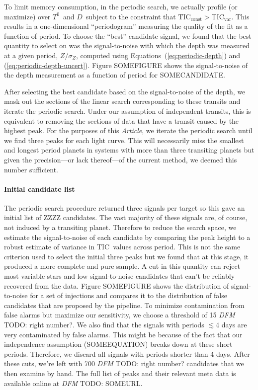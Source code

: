 \documentclass[12pt,preprint]{aastex}
\newcommand{\paper}{\textsl{Article}}
\newcommand{\TIC}{{\ensuremath{\mathrm{TIC}}}}
\newcommand{\todo}[3]{{\color{#2} \emph{#1} TODO: #3}}
\newcommand{\dfmtodo}[1]{\todo{DFM}{red}{#1}}
\newcommand{\phase}{{\ensuremath{T^0}}}
\newcommand{\duration}{{\ensuremath{D}}}
\newcommand{\depth}{{\ensuremath{Z}}}
\begin{document}
To limit memory consumption, in the periodic search, we actually profile (or
maximize) over \phase\ and \duration\ subject to the constraint that
$\TIC_\mathrm{const} > \TIC_\mathrm{var}$.
This results in a one-dimensional ``periodogram'' measuring the quality of
the fit as a function of period.
To choose the ``best'' candidate signal, we found that the best quantity to
select on was the signal-to-noise with which the depth was measured at a
given period, $\depth/\sigma_\depth$, computed using
Equations~(\ref{eq:periodic-depth}) and (\ref{eq:periodic-depth-uncert}).
Figure SOMEFIGURE shows the signal-to-noise of the depth measurement as a
function of period for SOMECANDIDATE.

After selecting the best candidate based on the signal-to-noise of the depth,
we mask out the sections of the linear search corresponding to these transits
and iterate the periodic search.
Under our assumption of independent transits, this is equivalent to removing
the sections of data that have a transit caused by the highest peak.
For the purposes of this \paper, we iterate the periodic search until we find
three peaks for each light curve.
This will necessarily miss the smallest and longest period planets in systems
with more than three transiting planets but given the precision---or lack
thereof---of the current method, we deemed this number sufficient.


\paragraph{Initial candidate list}

The periodic search procedure returned three signals per target so this gave
an initial list of ZZZZ candidates.
The vast majority of these signals are, of course, not induced by a
transiting planet.
Therefore to reduce the search space, we estimate the signal-to-noise of each
candidate by comparing the peak height to a robust estimate of variance in
\TIC\ values across period.
This is not the same criterion used to select the initial three peaks but we
found that at this stage, it produced a more complete and pure sample.
A cut in this quantity can reject most variable stars and low signal-to-noise
candidates that can't be reliably recovered from the data.
Figure SOMEFIGURE shows the distribution of signal-to-noise for a set of
injections and compares it to the distribution of false candidates that are
proposed by the pipeline.
To minimize contamination from false alarms but maximize our sensitivity, we
choose a threshold of 15 \dfmtodo{right number?}.
We also find that the signals with periods $\lesssim 4$ days are very
contaminated by false alarms.
This might be because of the fact that our independence assumption
(SOMEEQUATION) breaks down at these short periods.
Therefore, we discard all signals with periods shorter than 4 days.
After these cuts, we're left with 700 \dfmtodo{right number?} candidates that
we then examine by hand.
The full list of peaks and their relevant meta data is available online at
\dfmtodo{SOMEURL}.
\end{document}
